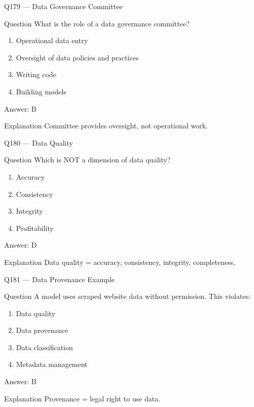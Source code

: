\documentclass[aspectratio=169,8pt]{beamer}
\begin{document}
	\begin{frame}{Q179 --- Data Governance Committee}
		\begin{block}{Question}
			What is the role of a data governance committee?
		\end{block}
		\begin{enumerate}
			\item Operational data entry
			\item Oversight of data policies and practices
			\item Writing code
			\item Building models
		\end{enumerate}
		\begin{exampleblock}{Answer: B}\end{exampleblock}
		\begin{block}{Explanation}
			Committee provides oversight, not operational work.
		\end{block}
	\end{frame}
	
	\begin{frame}{Q180 --- Data Quality}
		\begin{block}{Question}
			Which is NOT a dimension of data quality?
		\end{block}
		\begin{enumerate}
			\item Accuracy
			\item Consistency
			\item Integrity
			\item Profitability
		\end{enumerate}
		\begin{exampleblock}{Answer: D}\end{exampleblock}
		\begin{block}{Explanation}
			Data quality = accuracy, consistency, integrity, completeness.
		\end{block}
	\end{frame}
	
	\begin{frame}{Q181 --- Data Provenance Example}
		\begin{block}{Question}
			A model uses scraped website data without permission. This violates:
		\end{block}
		\begin{enumerate}
			\item Data quality
			\item Data provenance
			\item Data classification
			\item Metadata management
		\end{enumerate}
		\begin{exampleblock}{Answer: B}\end{exampleblock}
		\begin{block}{Explanation}
			Provenance = legal right to use data.
		\end{block}
	\end{frame}
	
\end{document}
